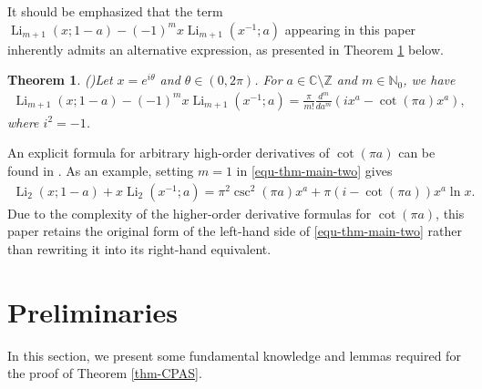 \documentclass[11pt]{article}
\let\oldsection\section
\renewcommand\section{\setcounter{equation}{0}\oldsection}
\DeclareMathOperator{\Li}{Li}
\def\N{\mathbb{N}}
\def\Z{\mathbb{Z}}
\theoremstyle{plain}
\newtheorem{thm}{Theorem}[section]
\theoremstyle{definition}
\begin{document}
It should be emphasized that the term $\Li_{m+1}(x;1-a)-(-1)^m x\Li_{m+1}(x^{-1};a)$ appearing in this paper inherently admits an alternative expression, as presented in Theorem \ref{thm-main-two} below.
\begin{thm} (\cite[Thm. 2.8]{Xu2026})\label{thm-main-two} Let $x=e^{i\theta}$ and $\theta\in (0,2\pi)$. For $a\in \mathbb{C}\setminus \Z$ and $m\in \N_0$, we have
\begin{align}\label{equ-thm-main-two}
\Li_{m+1}(x;1-a)-(-1)^m x\Li_{m+1}(x^{-1};a)=\frac{\pi}{m!}\frac{d^m}{da^m}\left(ix^a-\cot(\pi a)x^a\right),
\end{align}
where $i^2=-1$.
\end{thm}

An explicit formula for arbitrary high-order derivatives of $\cot(\pi a)$ can be found in \cite[Thm. 2.3]{Xu18}.
As an example, setting $m=1$ in \eqref{equ-thm-main-two} gives
\begin{align*}
\Li_2(x;1-a)+x\Li_2(x^{-1};a)=\pi^2\csc^2(\pi a)x^a+\pi(i-\cot(\pi a))x^a\ln x.
\end{align*}
Due to the complexity of the higher-order derivative formulas for $\cot(\pi a)$, this paper retains the original form of the left-hand side of \eqref{equ-thm-main-two} rather than rewriting it into its right-hand equivalent.

\section{Preliminaries}\label{sectwo}
In this section, we present some fundamental knowledge and lemmas required for the proof of Theorem \ref{thm-CPAS}.
\end{document}
